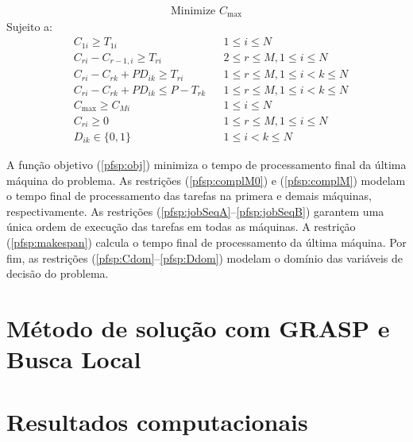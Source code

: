 \documentclass[12pt]{article}
\begin{document}
\begin{align}
   \text{Minimize } C_\mathrm{max} \label{pfsp:obj}
\end{align}
Sujeito a:
\begin{align}
   & C_{1i} \geqslant T_{1i} & & 1 \leqslant i \leqslant N \label{pfsp:complM0} \\
   & C_{ri} - C_{r-1,i} \geqslant T_{ri} & & 2 \leqslant r \leqslant M, 
      1 \leqslant i \leqslant N \label{pfsp:complM} \\
   & C_{ri} - C_{rk} + PD_{ik} \geqslant T_{ri} & & 1 \leqslant r \leqslant M, 
      1 \leqslant i < k \leqslant N \label{pfsp:jobSeqA}\\
   & C_{ri} - C_{rk} + PD_{ik} \leqslant P - T_{rk} & & 1 \leqslant r \leqslant M, 
      1 \leqslant i < k \leqslant N \label{pfsp:jobSeqB} \\
   & C_\mathrm{max} \geqslant C_{Mi} & & 1 \leqslant i \leqslant N \label{pfsp:makespan} \\
   & C_{ri} \geqslant 0 & & 1 \leqslant r \leqslant M, 1 \leqslant i \leqslant N \label{pfsp:Cdom}\\
   & D_{ik} \in \{0,1\} & & 1 \leqslant i < k \leqslant N \label{pfsp:Ddom}
\end{align}

A função objetivo (\ref{pfsp:obj}) minimiza o tempo de processamento final da
última máquina do problema. As restrições (\ref{pfsp:complM0}) e
(\ref{pfsp:complM}) modelam o tempo final de processamento das tarefas na
primera e demais máquinas, respectivamente. As restrições
(\ref{pfsp:jobSeqA}--\ref{pfsp:jobSeqB}) garantem uma única ordem de execução 
das tarefas em todas as máquinas. A restrição (\ref{pfsp:makespan}) calcula o
tempo final de processamento da última máquina. Por fim, as restrições
(\ref{pfsp:Cdom}--\ref{pfsp:Ddom}) modelam o domínio das variáveis de decisão do
problema.

\section{Método de solução com GRASP e Busca Local}

\section{Resultados computacionais}

\tiny

\normalsize
\end{document}
